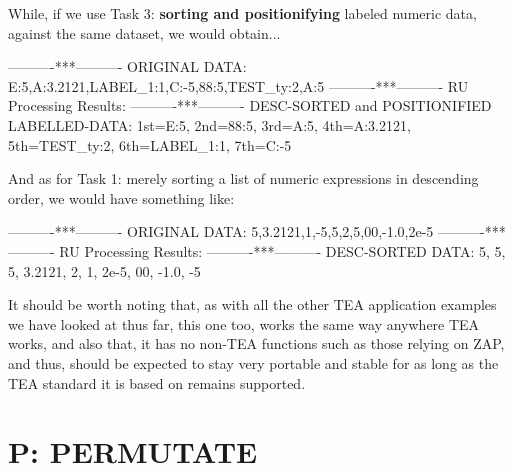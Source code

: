 \documentclass[a4paper, 18pt]{book} %
\begin{document}
{{ 
 \vspace{2em}
 
 
 While, if we use Task 3: \textbf{sorting and positionifying} labeled numeric data, against the same dataset, we would obtain...
 
 \vspace{2em}
 
  
     \begin{tcbverbatim}[title=Sample Well-formatted OUTPUT from Task 3 of RU]
----------***----------
ORIGINAL DATA:
E:5,A:3.2121,LABEL_1:1,C:-5,88:5,TEST_ty:2,A:5
----------***----------
RU Processing Results:
----------***----------
DESC-SORTED and POSITIONIFIED LABELLED-DATA: 
1st=E:5, 2nd=88:5, 3rd=A:5, 4th=A:3.2121, 5th=TEST_ty:2, 6th=LABEL_1:1, 7th=C:-5
  \end{tcbverbatim}
 
 \vspace{2em}
 

And as for Task 1: merely sorting a list of numeric expressions in descending order, we would have something like:

\vspace{2em}
  
   \begin{tcbverbatim}[title=Sample Well-formatted OUTPUT from Task 1 of RU]
----------***----------
ORIGINAL DATA:
5,3.2121,1,-5,5,2,5,00,-1.0,2e-5
----------***----------
RU Processing Results:
----------***----------
DESC-SORTED DATA: 
5, 5, 5, 3.2121, 2, 1, 2e-5, 00, -1.0, -5 
  \end{tcbverbatim}
 

\vspace{2em}


It should be worth noting that, as with all the other TEA application examples we have looked at thus far, this one too, works the same way anywhere TEA works, and also that, it has no non-TEA functions such as those relying on ZAP, and thus, should be expected to stay very portable and stable for as long as the TEA standard it is based on remains supported. 




\chapter{P: PERMUTATE}
\label{CHAPP}


\begin{table}[H]
  \centering
  \LARGE
	\begin{tabular}[t]{|p{}|p{}}
 

\end{tabular}
\end{table}}}
\end{document}
